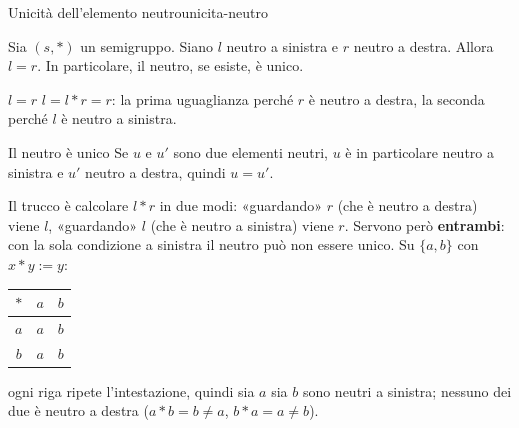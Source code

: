 
\begin{concetto}
\begin{Teorema}{Unicità dell'elemento neutro}{unicita-neutro}
    \begin{prerequisiti}
    \end{prerequisiti}
    Sia $(s, *)$ un semigruppo. Siano $l$ neutro a sinistra e $r$ neutro a destra. Allora $l = r$.
    In particolare, il neutro, se esiste, è unico.
\end{Teorema}
\begin{dimostrazione}
    \begin{caso}{$l = r$}
        $l = l * r = r$: la prima uguaglianza perché $r$ è neutro a destra, la seconda perché $l$ è neutro a sinistra.
    \end{caso}
    \begin{caso}{Il neutro è unico}
        Se $u$ e $u'$ sono due elementi neutri, $u$ è in particolare neutro a sinistra e $u'$ neutro a destra, quindi $u = u'$.
    \end{caso}
\end{dimostrazione}
\end{concetto}

\begin{spiegazione}
    Il trucco è calcolare $l * r$ in due modi: «guardando» $r$ (che è neutro a destra) viene $l$, «guardando» $l$ (che è neutro a sinistra) viene $r$.
    Servono però \textbf{entrambi}: con la sola condizione a sinistra il neutro può non essere unico. Su $\{a, b\}$ con $x * y := y$:
    \begin{center}
    \renewcommand{\arraystretch}{1.2}
    \begin{tabular}{c|cc}
        $*$ & $a$ & $b$ \\ \hline
        $a$ & $a$ & $b$ \\
        $b$ & $a$ & $b$ \\
    \end{tabular}
    \end{center}
    ogni riga ripete l'intestazione, quindi sia $a$ sia $b$ sono neutri a sinistra; nessuno dei due è neutro a destra ($a * b = b \neq a$, $b * a = a \neq b$).
\end{spiegazione}


